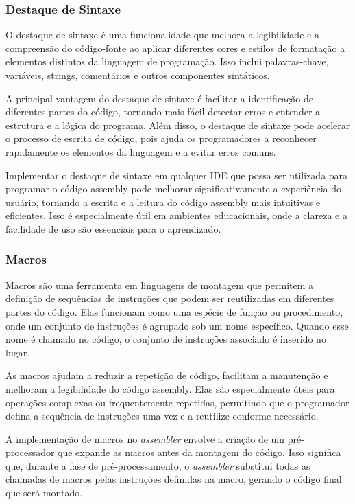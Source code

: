 \documentclass[
	12pt,				%
	openright,			%
	oneside,			%
	a4paper,			%
	english,			%
	french,				%
	spanish,			%
	brazil,				%
	]{abntex2}
\begin{document}
\subsubsection{Destaque de Sintaxe}\label{recursos_syntax}
O destaque de sintaxe é uma funcionalidade que melhora a legibilidade e a compreensão do código-fonte ao aplicar diferentes cores e estilos de formatação a elementos distintos da linguagem de programação. Isso inclui palavras-chave, variáveis, strings, comentários e outros componentes sintáticos.

A principal vantagem do destaque de sintaxe é facilitar a identificação de diferentes partes do código, tornando mais fácil detectar erros e entender a estrutura e a lógica do programa. Além disso, o destaque de sintaxe pode acelerar o processo de escrita de código, pois ajuda os programadores a reconhecer rapidamente os elementos da linguagem e a evitar erros comuns.

Implementar o destaque de sintaxe em qualquer IDE que possa ser utilizada para programar o código assembly pode melhorar significativamente a experiência do usuário, tornando a escrita e a leitura do código assembly mais intuitivas e eficientes. Isso é especialmente útil em ambientes educacionais, onde a clareza e a facilidade de uso são essenciais para o aprendizado.

\subsubsection{Macros}\label{recursos_macro}
Macros são uma ferramenta em linguagens de montagem que permitem a definição de sequências de instruções que podem ser reutilizadas em diferentes partes do código. Elas funcionam como uma espécie de função ou procedimento, onde um conjunto de instruções é agrupado sob um nome específico. Quando esse nome é chamado no código, o conjunto de instruções associado é inserido no lugar.

As macros ajudam a reduzir a repetição de código, facilitam a manutenção e melhoram a legibilidade do código assembly. Elas são especialmente úteis para operações complexas ou frequentemente repetidas, permitindo que o programador defina a sequência de instruções uma vez e a reutilize conforme necessário.

A implementação de macros no \textit{assembler} envolve a criação de um pré-processador que expande as macros antes da montagem do código. Isso significa que, durante a fase de pré-processamento, o \textit{assembler} substitui todas as chamadas de macros pelas instruções definidas na macro, gerando o código final que será montado.
\end{document}
